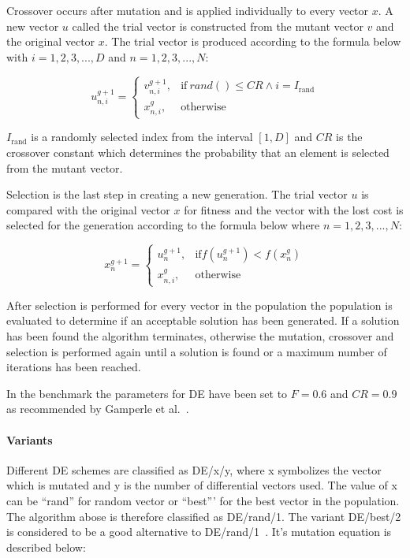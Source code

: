 Crossover occurs after mutation and is applied individually to every vector $x$. A new vector $u$ called the trial vector is constructed from the mutant vector $v$ and the original vector $x$. The trial vector is produced according to the formula below with $i=1,2,3,...,D$ and $n=1,2,3,...,N$:

\begin{equation}
    u_{n,i}^{g+1} =
    \begin{cases}
      v_{n,i}^{g+1}, & \text{if}\ rand() \leq CR \wedge i = I_{\text{rand}} \\
      x_{n,i}^{g}, & \text{otherwise}
\end{cases}
\end{equation}

$I_{\text{rand}}$ is a randomly selected index from the interval $[1,D]$ and $CR$ is the crossover constant which determines the probability that an element is selected from the mutant vector.

Selection is the last step in creating a new generation. The trial vector $u$ is compared with the original vector $x$ for fitness and the vector with the lost cost is selected for the generation according to the formula below where $n=1,2,3,...,N$:

\begin{equation}
    x_{n}^{g+1} =
    \begin{cases}
      u_{n}^{g+1}, & \text{if} f(u_{n}^{g+1}) < f(x_{n}^{g}) \\
      x_{n,i}^{g}, & \text{otherwise}
\end{cases}
\end{equation}

After selection is performed for every vector in the population the population is evaluated to determine if an acceptable solution has been generated. If a solution has been found the algorithm terminates, otherwise the mutation, crossover and selection is performed again until a solution is found or a maximum number of iterations has been reached.

In the benchmark the parameters for DE have been set to $F = 0.6$ and $CR=0.9$ as recommended by Gamperle et al.~\cite{gamperle2002parameter}.

\paragraph{Variants}

Different DE schemes are classified as DE/x/y, where x symbolizes the vector which is mutated and y is the number of differential vectors used. The value of x can be ``rand'' for random vector or ``best''' for the best vector in the population. The algorithm abose is therefore classified as DE/rand/1. The variant DE/best/2 is considered to be a good alternative to DE/rand/1~\cite{qin2009differential}. It's mutation equation is described below:

